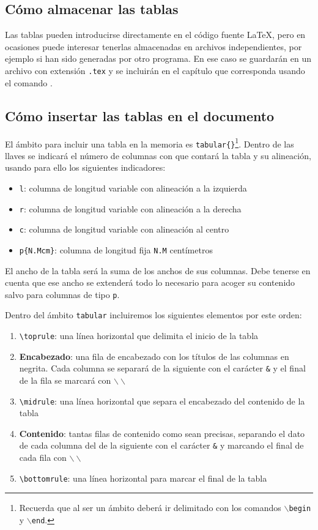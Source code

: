 \subsection{Cómo almacenar las tablas}

Las tablas pueden introducirse directamente en el código fuente \LaTeX, pero en ocasiones puede interesar tenerlas almacenadas en archivos independientes, por ejemplo si han sido generadas por otro programa. En ese caso se guardarán en un archivo con extensión \texttt{.tex} y se incluirán en el capítulo que corresponda usando el comando \verb||.

\subsection{Cómo insertar las tablas en el documento}

El ámbito para incluir una tabla en la memoria es \verb|tabular{}|\footnote{Recuerda que al ser un ámbito deberá ir delimitado con los comandos \texttt{$\backslash$begin} y \texttt{$\backslash$end}.}. Dentro de las llaves se indicará el número de columnas con que contará la tabla y su alineación, usando para ello los siguientes indicadores:

\begin{itemize}
    \item \texttt{l}: columna de longitud variable con alineación a la izquierda
    \item \texttt{r}: columna de longitud variable con alineación a la derecha
    \item \texttt{c}: columna de longitud variable con alineación al centro
    \item \texttt{p\{N.Mcm\}}: columna de longitud fija \texttt{N.M} centímetros
\end{itemize}

El ancho de la tabla será la suma de los anchos de sus columnas. Debe tenerse en cuenta que ese ancho se extenderá todo lo necesario para acoger su contenido salvo para columnas de tipo \texttt{p}.

Dentro del ámbito \texttt{tabular} incluiremos los siguientes elementos por este orden:

\begin{enumerate}
    \item \verb|\toprule|: una línea horizontal que delimita el inicio de la tabla
    \item \textbf{Encabezado}: una fila de encabezado con los títulos de las columnas en negrita. Cada columna se separará de la siguiente con el carácter \texttt{\&} y el final de la fila se marcará con \texttt{$\backslash\backslash$}
    \item \verb|\midrule|: una línea horizontal que separa el encabezado del contenido de la tabla
    \item \textbf{Contenido}: tantas filas de contenido como sean precisas, separando el dato de cada columna del de la siguiente con el carácter \texttt{\&} y marcando el final de cada fila con \texttt{$\backslash\backslash$}
    \item \verb|\bottomrule|: una línea horizontal para marcar el final de la tabla
\end{enumerate}


